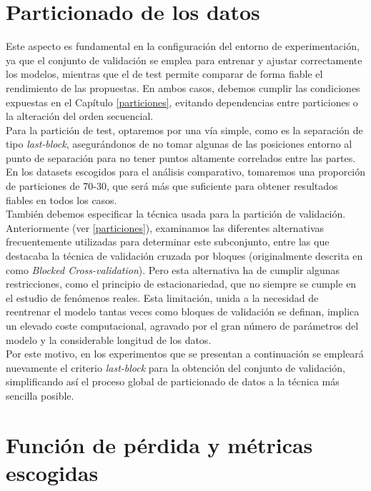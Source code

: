 \section{Particionado de los datos}

Este aspecto es fundamental en la configuración del entorno de experimentación, ya que el conjunto de validación se emplea para entrenar y ajustar correctamente los modelos, mientras que el de test permite comparar de forma fiable el rendimiento de las propuestas. En ambos casos, debemos cumplir las condiciones expuestas en el Capítulo \ref{particiones}, evitando dependencias entre particiones o la alteración del orden secuencial.\\

Para la partición de test, optaremos por una vía simple, como es la separación de tipo \textit{last-block}, asegurándonos de no tomar algunas de las posiciones entorno al punto de separación para no tener puntos altamente correlados entre las partes. En los datasets escogidos para el análisis comparativo, tomaremos una proporción de particiones de 70-30, que será más que suficiente para obtener resultados fiables en todos los casos.\\
 
También debemos especificar la técnica usada para la partición de validación. Anteriormente (ver \ref{particiones}), examinamos las diferentes alternativas frecuentemente utilizadas para determinar este subconjunto, entre las que destacaba la técnica de validación cruzada por bloques (originalmente descrita en \cite{bergmeir2012use} como \textit{Blocked Cross-validation}). Pero esta alternativa ha de cumplir algunas restricciones, como el principio de estacionariedad, que no siempre se cumple en el estudio de fenómenos reales. Esta limitación, unida a la necesidad de reentrenar el modelo tantas veces como bloques de validación se definan, implica un elevado coste computacional, agravado por el gran número de parámetros del modelo y la considerable longitud de los datos.\\

Por este motivo, en los experimentos que se presentan a continuación se empleará nuevamente el criterio \textit{last-block} para la obtención del conjunto de validación, simplificando así el proceso global de particionado de datos a la técnica más sencilla posible.

\section{Función de pérdida y métricas escogidas}

